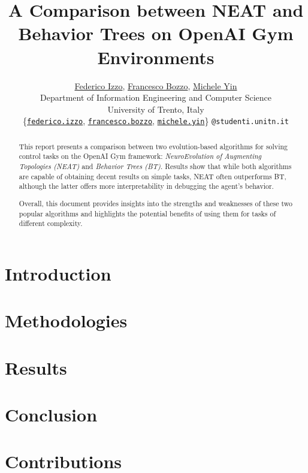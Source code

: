 \documentclass[journal]{IEEEtran}
\begin{document}
\title{A Comparison between NEAT and Behavior Trees on OpenAI Gym Environments}
\author{
\href{https://github.com/fedeizzo}{Federico Izzo},
\href{https://github.com/francescobozzo}{Francesco Bozzo},
\href{https://github.com/BigEmperor26}{Michele Yin}
\\Department of Information Engineering and Computer Science\\University of Trento, Italy\\

\normalsize\{\href{mailto:federico.izzo@studenti.unitn.it}{\texttt{federico.izzo}}, 
\href{mailto:francesco-bozzo@studenti.unitn.it}{\texttt{francesco.bozzo}},
\href{mailto:michele.yin@studenti.unitn.it}{\texttt{michele.yin}}\} \texttt{@studenti.unitn.it}\vspace{-1em}}%

\maketitle

\begin{abstract}
This report presents a comparison between two evolution-based algorithms for solving control tasks on the OpenAI Gym framework: \textit{NeuroEvolution of Augmenting Topologies (NEAT)} and \textit{Behavior Trees (BT)}. Results show that while both algorithms are capable of obtaining decent results on simple tasks, NEAT often outperforms BT, although the latter offers more interpretability in debugging the agent's behavior.

Overall, this document provides insights into the strengths and weaknesses of these two popular algorithms and highlights the potential benefits of using them for tasks of different complexity.
\end{abstract}

\IEEEpeerreviewmaketitle

\section{Introduction}
\label{sec:intro}


\section{Methodologies}
\label{sec:methodologies}


\section{Results}
\label{sec:results}


\section{Conclusion}
\label{sec:conclusion}


\section{Contributions}
\label{sec:contributions}



{}



\end{document}
